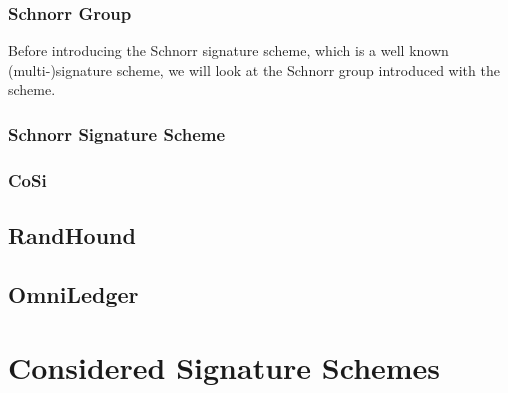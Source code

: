 \documentclass[12pt]{report}
\theoremstyle{plain}
\theoremstyle{definition}
\begin{document}
	\subsection{Schnorr Group}
	Before introducing the Schnorr signature scheme, which is a well known (multi-)signature scheme, we will look at the Schnorr group introduced with the scheme.
	
	\subsection{Schnorr Signature Scheme}
	\subsection{CoSi}
	\section{RandHound}
	\cite{randhound}
	\section{OmniLedger}
	\cite{omniledger}
	\chapter{Considered Signature Schemes}
	\cite{DBLP:conf/asiacrypt/BonehLS01}
	\printbibliography
\end{document}

